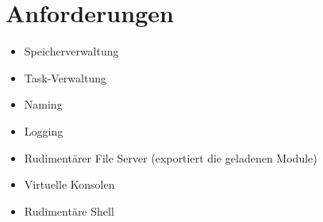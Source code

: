 \section{Anforderungen}

\begin{itemize}
	\item Speicherverwaltung
	\item Task-Verwaltung
	\item Naming
	\item Logging
	\item Rudimentärer File Server (exportiert die geladenen Module)
	\item Virtuelle Konsolen
	\item Rudimentäre Shell
\end{itemize}